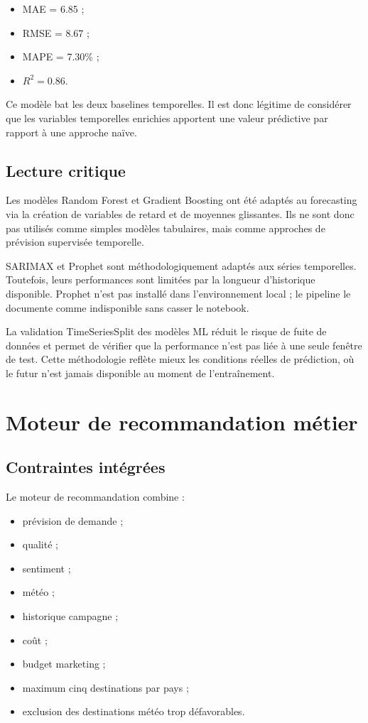 \documentclass[11pt,a4paper]{report}
\begin{document}
\begin{itemize}[leftmargin=*]
    \item MAE = 6.85 ;
    \item RMSE = 8.67 ;
    \item MAPE = 7.30\% ;
    \item $R^2 = 0.86$.
\end{itemize}

Ce modèle bat les deux baselines temporelles. Il est donc légitime de considérer que les variables temporelles enrichies apportent une valeur prédictive par rapport à une approche naïve.

\section{Lecture critique}

Les modèles Random Forest et Gradient Boosting ont été adaptés au forecasting via la création de variables de retard et de moyennes glissantes. Ils ne sont donc pas utilisés comme simples modèles tabulaires, mais comme approches de prévision supervisée temporelle.

SARIMAX et Prophet sont méthodologiquement adaptés aux séries temporelles. Toutefois, leurs performances sont limitées par la longueur d'historique disponible. Prophet n'est pas installé dans l'environnement local ; le pipeline le documente comme indisponible sans casser le notebook.

La validation TimeSeriesSplit des modèles ML réduit le risque de fuite de données et permet de vérifier que la performance n'est pas liée à une seule fenêtre de test. Cette méthodologie reflète mieux les conditions réelles de prédiction, où le futur n'est jamais disponible au moment de l'entraînement.

\chapter{Moteur de recommandation métier}

\section{Contraintes intégrées}

Le moteur de recommandation combine :

\begin{itemize}[leftmargin=*]
    \item prévision de demande ;
    \item qualité ;
    \item sentiment ;
    \item météo ;
    \item historique campagne ;
    \item coût ;
    \item budget marketing ;
    \item maximum cinq destinations par pays ;
    \item exclusion des destinations météo trop défavorables.
\end{itemize}
\end{document}
